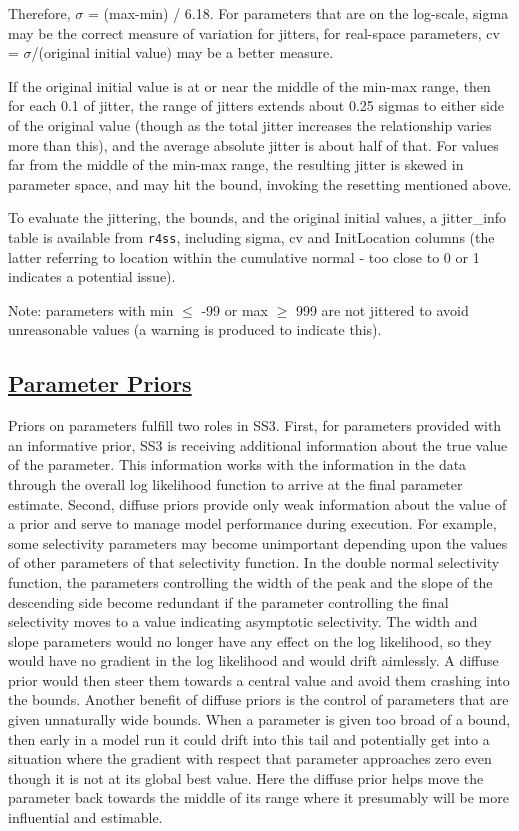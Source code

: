 Therefore, $\sigma$ = (max-min) / 6.18. For parameters that are on the log-scale, sigma may be the correct measure of variation for jitters, for real-space parameters, \gls{cv} = $\sigma$/(original initial value) may be a better measure. 

If the original initial value is at or near the middle of the min-max range, then for each 0.1 of jitter, the range of jitters extends about 0.25 sigmas to either side of the original value (though as the total jitter increases the relationship varies more than this), and the average absolute jitter is about half of that.  For values far from the middle of the min-max range, the resulting jitter is skewed in parameter space, and may hit the bound, invoking the resetting mentioned above. 

To evaluate the jittering, the bounds, and the original initial values, a jitter\_info table is available from \texttt{r4ss}, including sigma, \gls{cv} and InitLocation columns (the latter referring to location within the cumulative normal - too close to 0 or 1 indicates a potential issue).

Note: parameters with min $\leq$ -99 or max $\geq$ 999 are not jittered to avoid unreasonable values (a warning is produced to indicate this).

\hypertarget{PriorDescrip}{}
\subsection[Parameter Priors]{\protect\hyperlink{PriorDescrip}{Parameter Priors}}
Priors on parameters fulfill two roles in SS3. First, for parameters provided with an informative prior, SS3 is receiving additional information about the true value of the parameter. This information works with the information in the data through the overall log likelihood function to arrive at the final parameter estimate. Second, diffuse priors provide only weak information about the value of a prior and serve to manage model performance during execution. For example, some selectivity parameters may become unimportant depending upon the values of other parameters of that selectivity function. In the double normal selectivity function, the parameters controlling the width of the peak and the slope of the descending side become redundant if the parameter controlling the final selectivity moves to a value indicating asymptotic selectivity. The width and slope parameters would no longer have any effect on the log likelihood, so they would have no gradient in the log likelihood and would drift aimlessly. A diffuse prior would then steer them towards a central value and avoid them crashing into the bounds. Another benefit of diffuse priors is the control of parameters that are given unnaturally wide bounds. When a parameter is given too broad of a bound, then early in a model run it could drift into this tail and potentially get into a situation where the gradient with respect that parameter approaches zero even though it is not at its global best value. Here the diffuse prior helps move the parameter back towards the middle of its range where it presumably will be more influential and estimable.  

